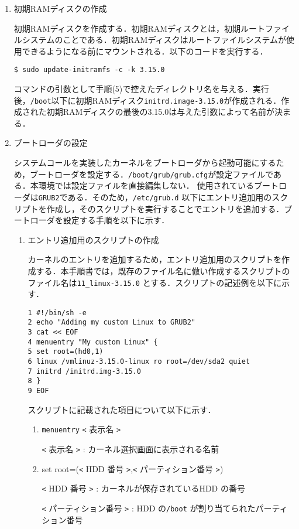 \documentclass[12pt]{jsarticle}
\begin{document}
\begin{enumerate}
\item 初期RAMディスクの作成

初期RAMディスクを作成する．初期RAMディスクとは，初期ルートファイルシステムのことである．初期RAMディスクはルートファイルシステムが使用できるようになる前にマウントされる．以下のコードを実行する．
\begin{verbatim}
$ sudo update-initramfs -c -k 3.15.0
\end{verbatim}
コマンドの引数として手順(5)で控えたディレクトリ名を与える．実行後，\verb|/boot|以下に初期RAMディスク\verb|initrd.image-3.15.0|が作成される．作成された初期RAMディスクの最後の3.15.0は与えた引数によって名前が決まる．

\item ブートローダの設定

システムコールを実装したカーネルをブートローダから起動可能にするため，ブートローダを設定する．\verb|/boot/grub/grub.cfg|が設定ファイルである．本環境では設定ファイルを直接編集しない．
使用されているブートローダは\verb|GRUB2|である．そのため，\verb|/etc/grub.d| 以下にエントリ追加用のスクリプトを作成し，そのスクリプトを実行することでエントリを追加する．ブートローダを設定する手順を以下に示す．

\begin{enumerate}
\item エントリ追加用のスクリプトの作成

カーネルのエントリを追加するため，エントリ追加用のスクリプトを作成する．本手順書では，既存のファイル名に倣い作成するスクリプトのファイル名は\verb|11_linux-3.15.0| とする．スクリプトの記述例を以下に示す．
\begin{verbatim}
1 #!/bin/sh -e
2 echo "Adding my custom Linux to GRUB2"
3 cat << EOF
4 menuentry "My custom Linux" {
5 set root=(hd0,1)
6 linux /vmlinuz-3.15.0-linux ro root=/dev/sda2 quiet
7 initrd /initrd.img-3.15.0
8 }
9 EOF
\end{verbatim}
スクリプトに記載された項目について以下に示す．

\begin{enumerate}
\item \verb|menuentry| \verb|<| 表示名 \verb|>|

\verb|<| 表示名 \verb|>| : カーネル選択画面に表示される名前

\item set root=(\verb|<| HDD 番号 \verb|>|,\verb|<| パーティション番号 \verb|>|)

\verb|<| HDD 番号 \verb|>| : カーネルが保存されているHDD の番号

\verb|<| パーティション番号 \verb|>| : HDD の\verb|/boot| が割り当てられたパーティション番号


\end{enumerate}
\end{enumerate}
\end{enumerate}
\end{document}
